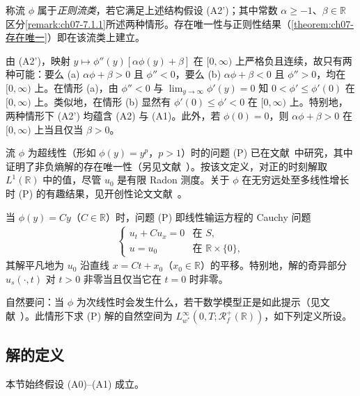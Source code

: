 \documentclass[../../main.tex]{subfiles}%
\begin{document}
\begin{definition}[流的类]\label{definition:ch07-流类}
称流 $\phi$ 属于\emph{正则流类}，若它满足上述结构假设 (A2')；其中常数 $\alpha\geqslant-1$、$\beta\in\mathbb{R}$ 区分\cref{remark:ch07-7.1.1}所述两种情形。存在唯一性与正则性结果（\cref{theorem:ch07-存在唯一}）即在该流类上建立。
\end{definition}

\begin{remark}\label{remark:ch07-7.1.1}
由 (A2')，映射 $y\mapsto\phi''(y)[\alpha\phi(y)+\beta]$ 在 $[0,\infty)$ 上严格负且连续，故只有两种可能：要么 (a) $\alpha\phi+\beta>0$ 且 $\phi''<0$，要么 (b) $\alpha\phi+\beta<0$ 且 $\phi''>0$，均在 $[0,\infty)$ 上。在情形 (a)，由 $\phi''<0$ 与 $\lim_{y\to\infty}\phi'(y)=0$ 知 $0<\phi'\leqslant\phi'(0)$ 在 $[0,\infty)$ 上。类似地，在情形 (b) 显然有 $\phi'(0)\leqslant\phi'<0$ 在 $[0,\infty)$ 上。特别地，两种情形下 (A2') 均蕴含 (A2) 与 (A1)。此外，若 $\phi(0)=0$，则 $\alpha\phi+\beta>0$ 在 $[0,\infty)$ 上当且仅当 $\beta>0$。
\end{remark}

流 $\phi$ 为超线性（形如 $\phi(y)=y^p$，$p>1$）时的问题 (P) 已在文献~\cite{ref67}中研究，其中证明了非负熵解的存在唯一性（另见文献~\cite{ref33}）。按该文定义，对正的时刻解取 $L^1(\mathbb{R})$ 中的值，尽管 $u_0$ 是有限 Radon 测度。关于 $\phi$ 在无穷远处至多线性增长时 (P) 的有趣结果，见开创性论文文献~\cite{ref39}。

当 $\phi(y)=Cy$（$C\in\mathbb{R}$）时，问题 (P) 即线性输运方程的 Cauchy 问题
\begin{align*}
\begin{cases}
u_t+Cu_x=0 & \text{在 }S,\\
u=u_0 & \text{在 }\mathbb{R}\times\{0\},
\end{cases}
\end{align*}
其解平凡地为 $u_0$ 沿直线 $x=Ct+x_0$（$x_0\in\mathbb{R}$）的平移。特别地，解的奇异部分 $u_s(\cdot,t)$ 对 $t>0$ 非零当且仅当它在 $t=0$ 时非零。

自然要问：当 $\phi$ 为次线性时会发生什么，若干数学模型正是如此提示（见文献~\cite{ref50,ref88,ref89}）。此情形下求 (P) 解的自然空间为 $L^\infty_{w^*}(0,T;\mathscr{R}_f^+(\mathbb{R}))$，如下列定义所设。

\subsection{解的定义}\label{subsection:ch07-解的定义}

本节始终假设 (A0)--(A1) 成立。
\end{document}
